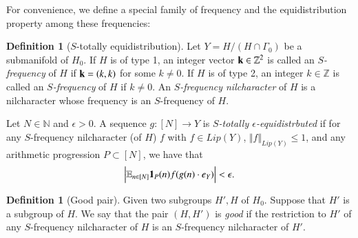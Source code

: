 \documentclass[12pt,amstex]{amsart}
\theoremstyle{definition}
\newtheorem{defn}[thm]{Definition}
\def \e {\epsilon}
\begin{document}
For convenience, we define a special family of frequency and the equidistribution property among these frequencies:
\begin{defn}[$S$-totally equidistribution]
Let $Y=H/(H\cap\Gamma_{0})$ be a submanifold of $H_{0}$.
If $H$ is of type 1, an integer vector $\bold{k}\in\mathbb{Z}^{2}$ is called an \emph{$S$-frequency} of $H$ if $\bold{k}=(k,k)$ for some $k\neq 0$.
If $H$ is of type 2, an integer $k\in\mathbb{Z}$ is called an \emph{$S$-frequency} of $H$ if $k\neq 0$.
An \emph{$S$-frequency nilcharacter} of $H$ is a nilcharacter whose frequency is an $S$-frequency of $H$.

   Let $N\in\mathbb{N}$ and $\e>0$. A sequence $g\colon [N]\rightarrow Y$ is  \emph{$S$-totally $\e$-equidistrbuted} if for any $S$-frequency nilcharacter (of $H$) $f$ with $f\in Lip(Y)$, $\Vert f\Vert_{Lip(Y)}\leq 1$, and any arithmetic progression $P\subset[N]$, we have that
  \begin{equation}\nonumber
    \begin{split}
      \Bigl\vert\mathbb{E}_{n\in[N]}\bold{1}_{P}(n)f(g(n)\cdot e_{Y})\Bigr\vert<\e.
    \end{split}
  \end{equation}
\end{defn}

\begin{defn} [Good pair]
Given two subgroups $H',H$ of $H_{0}$. Suppose that $H'$ is a subgroup of $H$. We say that the pair $(H,H')$ is \emph{good} if the restriction to $H'$ of any $S$-frequency nilcharacter of $H$ is an $S$-frequency nilcharacter of $H'$.
\end{defn}
\end{document}
